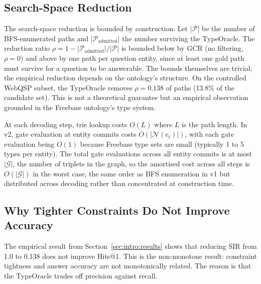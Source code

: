 \subsection{Search-Space Reduction}
\label{sec:theoretical:reduction}

The search-space reduction is bounded by construction. Let $|\mathcal{P}|$ be the
number of BFS-enumerated paths and $|\mathcal{P}_{\text{admitted}}|$ the number
surviving the TypeOracle. The reduction ratio
$\rho = 1 - |\mathcal{P}_{\text{admitted}}| / |\mathcal{P}|$ is bounded below by GCR
(no filtering, $\rho = 0$) and above by one path per question entity, since at least
one gold path must survive for a question to be answerable. The bounds themselves are
trivial; the empirical reduction depends on the ontology's structure. On the controlled
WebQSP subset, the TypeOracle removes $\rho = 0.138$ of paths (13.8\% of the candidate
set). This is not a theoretical guarantee but an empirical observation grounded in the
Freebase ontology's type system.

At each decoding step, trie lookup costs $O(L)$ where $L$ is the path length. In v2,
gate evaluation at entity commits costs $O(|\mathcal{N}(e_t)|)$, with each gate
evaluation being $O(1)$ because Freebase type sets are small (typically 1 to 5 types
per entity). The total gate evaluations across all entity commits is at most
$|\mathcal{G}|$, the number of triplets in the graph, so the amortised cost across all
steps is $O(|\mathcal{G}|)$ in the worst case, the same order as BFS enumeration in v1
but distributed across decoding rather than concentrated at construction time.

\subsection{Why Tighter Constraints Do Not Improve Accuracy}
\label{sec:theoretical:nonmonotone}

The empirical result from Section~\ref{sec:intro:results} shows that reducing SIR from
1.0 to 0.138 does not improve Hits@1. This is the non-monotone result: constraint
tightness and answer accuracy are not monotonically related. The reason is that the
TypeOracle trades off precision against recall.

